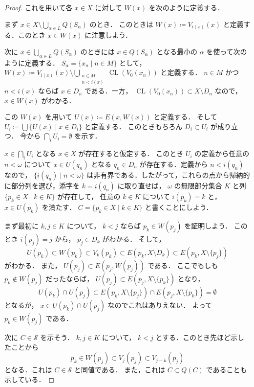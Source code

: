 \documentclass[leqno, 12pt]{ltjsarticle}
\DeclareMathOperator{\cl}{CL}
\begin{document}
\begin{proof}
これを用いて各
$x\in X$
に対して
$W(x)$
を次のように定義する．

まず
$x\in X\setminus \bigcup_{\alpha\in L}Q(S_{\alpha}) $
のとき．
このときは
$W(x)\coloneqq V_{i(x)}(x)$
と定義する．このとき
$x\in W(x)$
に注意しよう．

次に
$x\in \bigcup_{\alpha\in L}Q(S_{\alpha})$
のときには
$x\in Q(S_{\alpha})$
となる最小の
$\alpha$
を使って次のように定義する．
$S_{\alpha}=\{x_{n} \mid n\in M\}$
として，
$W(x)\coloneqq V_{i(x)}(x)\setminus \bigcup_{\substack{n\in M\\n<i(x)}}\cl(V_{0}(x_{n}))$
と定義する．
$n\in M$
かつ
$n<i(x)$
ならば
$x\in D_{n}$
である．一方，
$\cl(V_{0}(x_{n}))\subset X\setminus D_{n}$
なので，
$x\in W(x)$
がわかる．

この
$W(x)$
を用いて
$U(x)\coloneqq E(x,W(x))$
と定義する．
そして
$U_{i}\coloneqq\bigcup\{U(x) \mid x\in D_{i}\}$
と定義する．
このときもちろん
$D_{i}\subset U_{i}$
が成り立つ．
今から
$\bigcap_{i}U_{i}=\emptyset$
を示す．

$x\in \bigcap_{i}U_{i}$
となる
$x\in X$
が存在すると仮定する．
このとき
$U_{i}$
の定義から任意の
$n<\omega$
について
$x\in U(q_{n})$
となる
$q_{n}\in D_{n}$
が存在する．定義から
$n<i(q_{n})$
なので，
$\{i(q_{n}) \mid n<\omega\}$
は非有界である．したがって，これらの点から帰納的に部分列を選び，添字を
$k=i(q_{n})$
に取り直せば，
$\omega$
の無限部分集合
$K$
と列
$\{p_{k}\in X \mid k\in K\}$
が存在して，
任意の
$k\in K$
について
$i(p_{k})=k$
と，
$x\in U(p_{k})$
を満たす．
$C=\{p_{k}\in X \mid k\in K\}$
と書くことにしよう．

まず最初に
$k, j\in K$
について，
$k<j$
ならば
$p_{k}\in W(p_{j})$
を証明しよう．
このとき
$i(p_{j})=j$
から，
$p_{j}\in D_{k}$
がわかる．
そして，
\[
U(p_{k})\subset W(p_{k})\subset V_{k}(p_{k})\subset E(p_{k}, X\setminus D_{k})\subset E(p_{k}, X\setminus \{p_{j}\})
\]
がわかる．
また，
$U(p_{j})\subset E(p_{j}, W(p_{j}))$
である．
ここでもしも
$p_{k}\notin W(p_{j})$
だったならば，
$U(p_{j})\subset E(p_{j}, X\setminus \{p_{k}\})$
となり，
\[
U(p_{k})\cap U(p_{j})\subset E(p_{k}, X\setminus \{p_{j}\})\cap E(p_{j}, X\setminus \{p_{k}\})=\emptyset
\]
となるが，
$x\in U(p_{k})\cap U(p_{j})$
なのでこれはありえない．
よって
$p_{k}\in W(p_{j})$
である．


次に
$C\in \mathcal{S}$
を示そう．
$k, j\in K$
について，
$k<j$
とする．このとき先ほど示したことから
\[
p_{k}\in W(p_{j})\subset V_{j}(p_{j})\subset V_{j-k}(p_{j})
\]
となる．これは
$C\in \mathcal{S}$
と同値である．
また，これは
$C\subset Q(C)$
であることも示している．



\end{proof}
\end{document}
